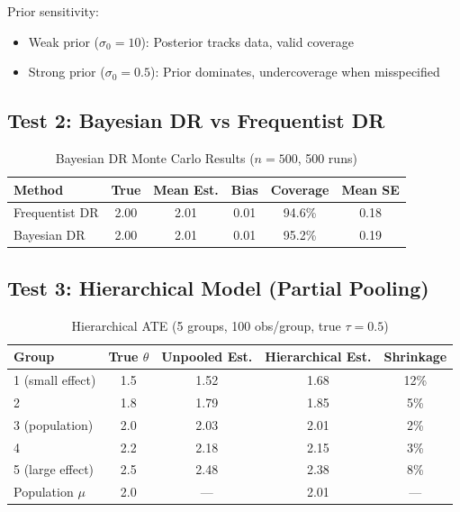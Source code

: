 \begin{insight}
Prior sensitivity:
\begin{itemize}
\item Weak prior ($\sigma_0 = 10$): Posterior tracks data, valid coverage
\item Strong prior ($\sigma_0 = 0.5$): Prior dominates, undercoverage when misspecified
\end{itemize}
\end{insight}

\subsection{Test 2: Bayesian DR vs Frequentist DR}

\begin{table}[h]
\centering
\caption{Bayesian DR Monte Carlo Results ($n=500$, 500 runs)}
\begin{tabular}{lccccc}
\toprule
Method & True & Mean Est. & Bias & Coverage & Mean SE \\
\midrule
Frequentist DR & 2.00 & 2.01 & 0.01 & 94.6\% & 0.18 \\
Bayesian DR & 2.00 & 2.01 & 0.01 & 95.2\% & 0.19 \\
\bottomrule
\end{tabular}
\end{table}

\subsection{Test 3: Hierarchical Model (Partial Pooling)}

\begin{table}[h]
\centering
\caption{Hierarchical ATE (5 groups, 100 obs/group, true $\tau = 0.5$)}
\begin{tabular}{lcccc}
\toprule
Group & True $\theta$ & Unpooled Est. & Hierarchical Est. & Shrinkage \\
\midrule
1 (small effect) & 1.5 & 1.52 & 1.68 & 12\% \\
2 & 1.8 & 1.79 & 1.85 & 5\% \\
3 (population) & 2.0 & 2.03 & 2.01 & 2\% \\
4 & 2.2 & 2.18 & 2.15 & 3\% \\
5 (large effect) & 2.5 & 2.48 & 2.38 & 8\% \\
\midrule
Population $\mu$ & 2.0 & --- & 2.01 & --- \\
\bottomrule
\end{tabular}
\end{table}


